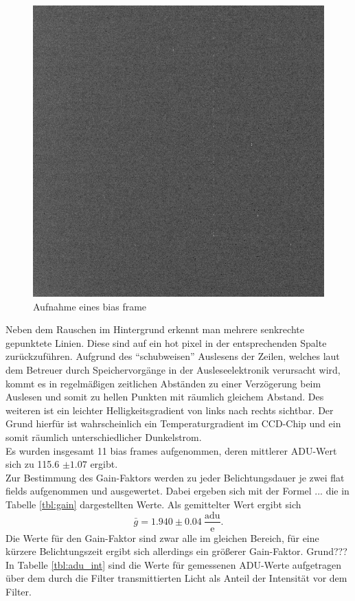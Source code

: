 \begin{figure}[h!]
        \includegraphics[width=.9\textwidth]{beiers_01.png}
\caption{ Aufnahme eines bias frame }
\label{fig:bias}
\end{figure}
Neben dem Rauschen im Hintergrund erkennt man mehrere senkrechte gepunktete Linien. Diese sind auf ein hot pixel in der entsprechenden Spalte zurückzuführen. Aufgrund des \enquote{schubweisen} Auslesens der Zeilen, welches  laut dem Betreuer durch Speichervorgänge in der Ausleseelektronik verursacht wird, kommt es in regelmäßigen zeitlichen Abständen zu einer Verzögerung beim Auslesen und somit zu hellen Punkten mit räumlich gleichem Abstand. Des weiteren ist ein leichter Helligkeitsgradient von links nach rechts sichtbar. Der Grund hierfür ist wahrscheinlich ein Temperaturgradient im CCD-Chip und ein somit räumlich unterschiedlicher Dunkelstrom. \\
Es wurden insgesamt 11 bias frames aufgenommen, deren mittlerer ADU-Wert sich zu 115.6 $ \pm 1.07$ ergibt. \\
Zur Bestimmung des Gain-Faktors werden zu jeder Belichtungsdauer je zwei flat fields aufgenommen und ausgewertet. Dabei ergeben sich mit der Formel ... die in Tabelle \ref{tbl:gain} dargestellten Werte. Als gemittelter Wert ergibt sich 
\begin{equation}
\bar{g} = 1.940 \pm 0.04 \ \frac{\mathrm{adu}}{\mathrm{e}}. 
\end{equation}
Die Werte für den Gain-Faktor sind zwar alle im gleichen Bereich, für eine kürzere Belichtungszeit ergibt sich allerdings ein größerer Gain-Faktor. Grund???\\
In Tabelle \ref{tbl:adu_int} sind die Werte für gemessenen ADU-Werte aufgetragen über dem durch die Filter transmittierten Licht als Anteil der Intensität vor dem Filter. 
